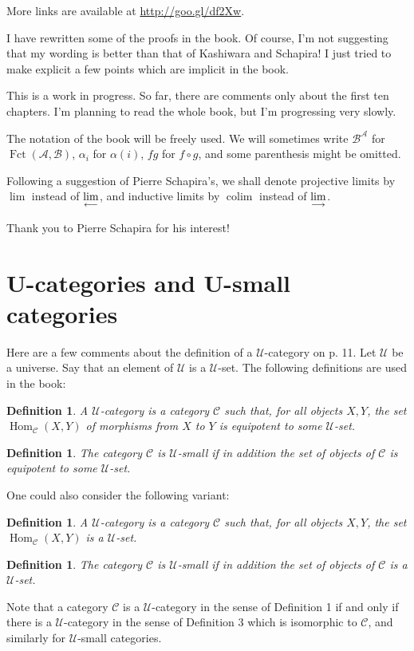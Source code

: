 \documentclass[12pt]{article}
\newtheorem{df}[thm]{Definition}%
\theoremstyle{remark}%
\newcommand{\A}{\mathcal A}
\newcommand{\B}{\mathcal B}
\newcommand{\C}{\mathcal C}
\newcommand{\U}{\mathcal U}
\newcommand{\ilim}{\operatornamewithlimits{\underset{\longrightarrow}{lim}}}
\newcommand{\plim}{\operatornamewithlimits{\underset{\longleftarrow}{lim}}}
\DeclareMathOperator*{\coli}{colim}
\DeclareMathOperator{\Fct}{Fct}
\DeclareMathOperator{\Hom}{Hom}
\begin{document}
More links are available at \href{http://goo.gl/df2Xw}{http://goo.gl/df2Xw}.

I have rewritten some of the proofs in the book. Of course, I'm not suggesting that my wording is better than that of Kashiwara and Schapira! I just tried to make explicit a few points which are implicit in the book. 

This is a work in progress. So far, there are comments only about the first ten chapters. I'm planning to read the whole book, but I'm progressing very slowly.

The notation of the book will be freely used. We will sometimes write $\B^\A$ for $\Fct(\A,\B)$, $\alpha_i$ for $\alpha(i)$, $fg$ for $f\circ g$, and some parenthesis might be omitted. 

Following a suggestion of Pierre Schapira's, we shall denote projective limits by $\lim$ instead of $\plim$, and inductive limits by $\coli$ instead of $\ilim$. 

Thank you to Pierre Schapira for his interest!%
%
\section{U-categories and U-small categories}\label{ucat}
% 
Here are a few comments about the definition of a $\U$-category on p. 11. Let $\U$ be a universe. Say that an element of $\U$ is a $\U$-set. The following definitions are used in the book: 
%
\begin{df} 
A $\U$-category is a category $\C$ such that, for all objects $X,Y$, the set $\Hom_\C(X,Y)$ of morphisms from $X$ to $Y$ is equipotent to some $\U$-set. 
\end{df} 
% 
\begin{df}
The category $\C$ is $\U$-small if in addition the set of objects of $\C$ is equipotent to some $\U$-set. 
\end{df} 
% 
One could also consider the following variant: 
% 
\begin{df}\label{ducat}
A $\U$-category is a category $\C$ such that, for all objects $X,Y$, the set $\Hom_\C(X,Y)$ is a $\U$-set. 
\end{df} 
% 
\begin{df}\label{small}
The category $\C$ is $\U$-small if in addition the set of objects of $\C$ is a $\U$-set. 
\end{df} 
% 
Note that a category $\C$ is a $\U$-category in the sense of Definition 1 if and only if there is a $\U$-category in the sense of Definition 3 which is isomorphic to $\C$, and similarly for $\U$-small categories.\bigskip
\end{document}
